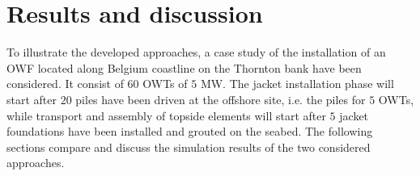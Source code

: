 \section{Results and discussion}
\label{results}
To illustrate the developed approaches, a case study of the installation of an OWF located along Belgium coastline on the Thornton bank have been considered. It consist of $60$ OWTs of $5$ MW.
The jacket installation phase will start after $20$ piles have been driven at the offshore site, i.e. the piles for $5$ OWTs, while transport and assembly of topside elements will start after $5$ jacket foundations have been installed and grouted on the seabed.
The following sections compare and discuss the simulation results of the two considered approaches.